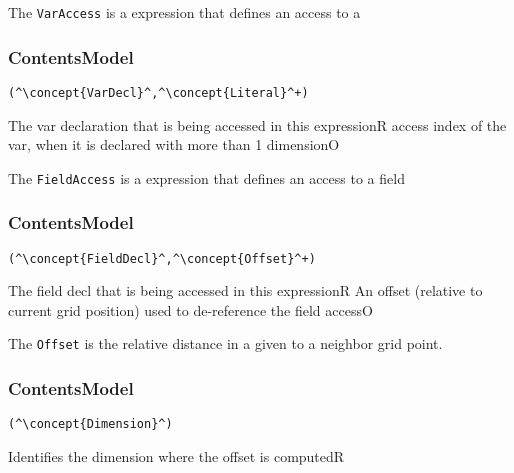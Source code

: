 The {\tt VarAccess} is a expression that defines an access to a 

\subsubsection*{ContentsModel}{}

\begin{lstlisting}[style=default]
(^\concept{VarDecl}^,^\concept{Literal}^+)
\end{lstlisting}

\begin{HIRChildElements}
	{The var declaration that is being accessed in this expression}{R}
	{access index of the var, when it is declared with more than 1 dimension}{O}
\end{HIRChildElements}


 The {\tt FieldAccess} is a expression that defines an access to a field
 
\subsubsection*{ContentsModel}{}

\begin{lstlisting}[style=default]
(^\concept{FieldDecl}^,^\concept{Offset}^+)
\end{lstlisting}

\begin{HIRChildElements}
	{The field decl that is being accessed in this expression}{R}
	{An offset (relative to current grid position) used to de-reference the field access}{O}
\end{HIRChildElements}


The {\tt Offset} is the relative distance in a given  to a neighbor grid point.

\subsubsection*{ContentsModel}{}

\begin{lstlisting}[style=default]
(^\concept{Dimension}^)
\end{lstlisting}

\begin{HIRChildElements}
	{Identifies the dimension where the offset is computed}{R}
\end{HIRChildElements}

